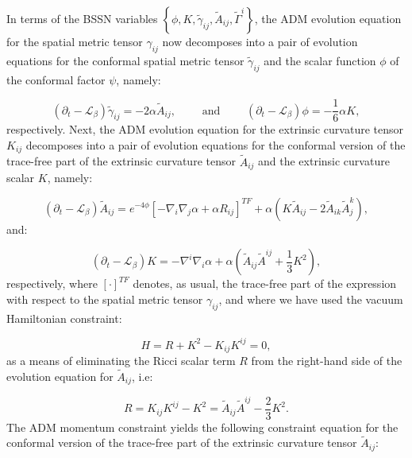 \documentclass{article}
\begin{document}
In terms of the BSSN variables ${\left\lbrace \phi, K, \tilde{\gamma}_{i j}, \tilde{A}_{i j}, \tilde{\Gamma}^i \right\rbrace}$, the ADM evolution equation for the spatial metric tensor ${\gamma_{i j}}$ now decomposes into a pair of evolution equations for the conformal spatial metric tensor ${\tilde{\gamma}_{i j}}$ and the scalar function ${\phi}$ of the conformal factor ${\psi}$, namely:

\begin{equation}
\left( \partial_t - \mathcal{L}_{\beta} \right) \tilde{\gamma}_{i j} = -2 \alpha \tilde{A}_{i j}, \qquad \text{ and } \qquad \left( \partial_t - \mathcal{L}_{\beta} \right) \phi = - \frac{1}{6} \alpha K,
\end{equation}
respectively. Next, the ADM evolution equation for the extrinsic curvature tensor ${K_{i j}}$ decomposes into a pair of evolution equations for the conformal version of the trace-free part of the extrinsic curvature tensor ${\tilde{A}_{i j}}$ and the extrinsic curvature scalar $K$, namely:

\begin{equation}
\left( \partial_t - \mathcal{L}_{\beta} \right) \tilde{A}_{i j} = e^{-4 \phi} \left[ - \nabla_i \nabla_j \alpha + \alpha R_{i j} \right]^{TF} + \alpha \left( K \tilde{A}_{i j} - 2 \tilde{A}_{i k} \tilde{A}_{j}^{k} \right),
\end{equation}
and:

\begin{equation}
\left( \partial_t - \mathcal{L}_{\beta} \right) K = - \nabla^i \nabla_i \alpha + \alpha \left( \tilde{A}_{i j} \tilde{A}^{i j} + \frac{1}{3} K^2 \right),
\end{equation}
respectively, where ${\left[ \cdot \right]^{TF}}$ denotes, as usual, the trace-free part of the expression with respect to the spatial metric tensor ${\gamma_{i j}}$, and where we have used the vacuum Hamiltonian constraint:

\begin{equation}
H = R + K^2 - K_{i j} K^{i j} = 0,
\end{equation}
as a means of eliminating the Ricci scalar term $R$ from the right-hand side of the evolution equation for ${\tilde{A}_{i j}}$, i.e:

\begin{equation}
R = K_{i j} K^{i j} - K^2 = \tilde{A}_{i j} \tilde{A}^{i j} - \frac{2}{3} K^2.
\end{equation}
The ADM momentum constraint yields the following constraint equation for the conformal version of the trace-free part of the extrinsic curvature tensor ${\tilde{A}_{i j}}$:
\end{document}
